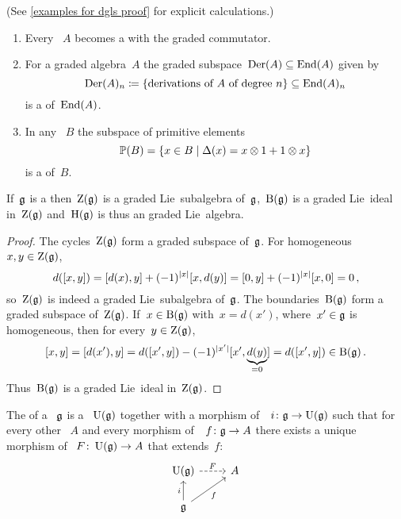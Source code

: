 \documentclass[a4paper,10pt,headings=standardclasses]{scrartcl}
\begin{document}
\begin{example}
  \label{examples for dgls}
  (See \cref{examples for dgls proof} for explicit calculations.)
  \begin{enumerate}
    \item
      Every {\dga}~$A$ becomes a {\dgl} with the graded commutator.
    \item
      For a graded algebra~$A$ the graded subspace~$\operatorname{Der}(A) \subseteq \operatorname{End}(A)$ given by
      \[
        \operatorname{Der}(A)_n
        \coloneqq
        \{
          \text{derivations of~$A$ of degree~$n$}
        \}
        \subseteq
        \operatorname{End}(A)_n
      \]
      is a {\dglsub} of~$\operatorname{End}(A)$.
    \item
      In any {\dgb}~$B$ the subspace of primitive elements
      \[
        \prim(B)
        =
        \{
          x \in B
        \suchthat
          \Delta(x) = x \tensor 1 + 1 \tensor x
        \}
      \]
      is a {\dglsub} of~$B$.
  \end{enumerate}
\end{example}

\begin{lemma}
  \label{homology of dgl}
  If~$\mathfrak{g}$ is a {\dgl} then~$\operatorname{Z}(\mathfrak{g})$ is a graded Lie~subalgebra of~$\mathfrak{g}$,~$\operatorname{B}(\mathfrak{g})$ is a graded Lie~ideal in~$\operatorname{Z}(\mathfrak{g})$ and~$\operatorname{H}(\mathfrak{g})$ is thus an graded Lie~algebra. 
\end{lemma}

\begin{proof}
  The cycles~$\operatorname{Z}(\mathfrak{g})$ form a graded subspace of~$\mathfrak{g}$.
  For homogeneous~$x, y \in \operatorname{Z}(\mathfrak{g})$,
  \[
    d([x,y])
    =
    [d(x), y] + (-1)^{\lvert x\rvert} [x, d(y)]
    =
    [0, y] + (-1)^{\lvert x\rvert} [x, 0]
    =
    0 \,,
  \]
  so~$\operatorname{Z}(\mathfrak{g})$ is indeed a graded Lie~subalgebra of~$\mathfrak{g}$.
  The boundaries~$\operatorname{B}(\mathfrak{g})$ form a graded subspace of~$\operatorname{Z}(\mathfrak{g})$.
  If~$x \in \operatorname{B}(\mathfrak{g})$ with~$x = d(x')$, where~$x' \in \mathfrak{g}$ is homogeneous, then for every~$y \in \operatorname{Z}(\mathfrak{g})$,
  \[
    [x,y]
    =
    [d(x'), y]
    =
    d([x',y]) - (-1)^{\lvert x'\rvert} [x', \underbrace{d(y)}_{=0}]
    =
    d([x',y])
    \in
    \operatorname{B}(\mathfrak{g}) \,.
  \]
  Thus~$\operatorname{B}(\mathfrak{g})$ is a graded Lie~ideal in~$\operatorname{Z}(\mathfrak{g})$.
\end{proof}

\begin{definition}
  The  of a {\dgl}~$\mathfrak{g}$ is a {\dga}~$\operatorname{U}(\mathfrak{g})$ together with a morphism of~{\dgls}~$i \colon \mathfrak{g} \to \operatorname{U}(\mathfrak{g})$ such that for every other {\dga}~$A$ and every morphism of~{\dgls}~$f \colon \mathfrak{g} \to A$ there exists a unique morphism of {\dgas}~$F \colon \operatorname{U}(\mathfrak{g}) \to A$ that extends~$f$:
  \[
    \begin{tikzcd}
      \Univ(\glie)
      \arrow[dashed]{r}[above]{F}
      &
      A
      \\
      \glie
      \arrow{u}[left]{i}
      \arrow{ur}[below right]{f}
      &
      {}
    \end{tikzcd}
  \]
\end{definition}
\end{document}
